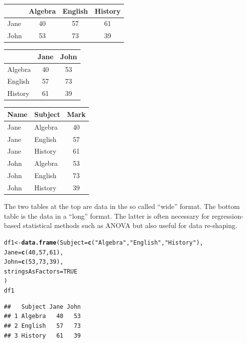 \documentclass[12pt]{article}\usepackage[]{graphicx}\usepackage[]{xcolor}
\makeatletter
\newcommand{\hlnum}[1]{\textcolor[rgb]{0.686,0.059,0.569}{#1}}%
\newcommand{\hlsng}[1]{\textcolor[rgb]{0.192,0.494,0.8}{#1}}%
\newcommand{\hldef}[1]{\textcolor[rgb]{0.345,0.345,0.345}{#1}}%
\newcommand{\hlkwb}[1]{\textcolor[rgb]{0.69,0.353,0.396}{#1}}%
\newcommand{\hlkwc}[1]{\textcolor[rgb]{0.333,0.667,0.333}{#1}}%
\newcommand{\hlkwd}[1]{\textcolor[rgb]{0.737,0.353,0.396}{\textbf{#1}}}%
\newenvironment{kframe}{%
 \def\at@end@of@kframe{}%
 \ifinner\ifhmode%
  \def\at@end@of@kframe{\end{minipage}}%
  \begin{minipage}{\columnwidth}%
 \fi\fi%
 \def\FrameCommand##1{\hskip\@totalleftmargin \hskip-\fboxsep
 \colorbox{shadecolor}{##1}\hskip-\fboxsep
     \hskip-\linewidth \hskip-\@totalleftmargin \hskip\columnwidth}%
 \MakeFramed {\advance\hsize-\width
   \@totalleftmargin\z@ \linewidth\hsize
   \@setminipage}}%
 {\par\unskip\endMakeFramed%
 \at@end@of@kframe}
\newenvironment{knitrout}{}{} %
\makeatother
\begin{document}
    \begin{center}
     \begin{tabular}[b]{l|c|c|c|}
        & Algebra & English & History \\
      \hline
       Jane & 40 & 57 & 61 \\
      \hline 
       John & 53 & 73 & 39 \\
      \hline 
     \end{tabular}
     \qquad
     \begin{tabular}[b]{l|c|c|}
        & Jane & John \\
      \hline
       Algebra & 40 & 53 \\
      \hline 
       English & 57 & 73 \\
      \hline
       History & 61 & 39 \\
      \hline 
     \end{tabular}
     
     \bigskip
     
     \begin{tabular}[t]{l|l|c}
       Name & Subject & Mark\\
      \hline
       Jane & Algebra & 40\\
       Jane & English & 57 \\
       Jane & History & 61 \\
       John & Algebra & 53\\
       John & English & 73 \\
       John & History & 39 \\
     \end{tabular}
   \end{center}

The two tables at the top are data in the so called ``wide'' format. 
The bottom table is the data in a ``long'' format. 
The latter is often necessary for regression-based statistical methods such as ANOVA but
also useful for data re-shaping.

\begin{knitrout}
\color{fgcolor}\begin{kframe}
\begin{alltt}
\hldef{df1} \hlkwb{<-} \hlkwd{data.frame}\hldef{(}\hlkwc{Subject}\hldef{=}\hlkwd{c}\hldef{(}\hlsng{"Algebra"}\hldef{,}\hlsng{"English"}\hldef{,}\hlsng{"History"}\hldef{),}
                  \hlkwc{Jane}\hldef{=}\hlkwd{c}\hldef{(}\hlnum{40}\hldef{,}\hlnum{57}\hldef{,}\hlnum{61}\hldef{),}
                  \hlkwc{John}\hldef{=}\hlkwd{c}\hldef{(}\hlnum{53}\hldef{,}\hlnum{73}\hldef{,}\hlnum{39}\hldef{),}
                  \hlkwc{stringsAsFactors}\hldef{=}\hlnum{TRUE}
                  \hldef{)}
\hldef{df1}
\end{alltt}
\begin{verbatim}
##   Subject Jane John
## 1 Algebra   40   53
## 2 English   57   73
## 3 History   61   39
\end{verbatim}
\end{kframe}
\end{knitrout}
\end{document}
